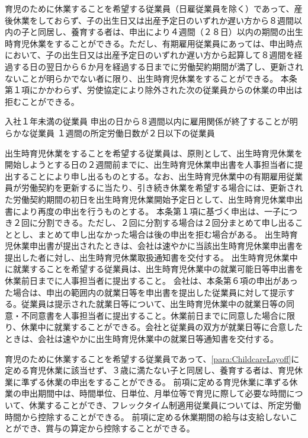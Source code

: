 \documentclass[10pt,a4paper,uplatex]{jsarticle}
\begin{document}
育児のために休業することを希望する従業員（日雇従業員を除く）であって、産後休業をしておらず、子の出生日又は出産予定日のいずれか遅い方から８週間以内の子と同居し、養育する者は、申出により４週間（２８日）以内の期間の出生時育児休業をすることができる。ただし、有期雇用従業員にあっては、申出時点において、子の出生日又は出産予定日のいずれか遅い方から起算して８週間を経過する日の翌日から６か月を経過する日までに労働契約期間が満了し、更新されないことが明らかでない者に限り、出生時育児休業をすることができる。
\label{para:ChildbirthChildcareLayoff}
\term 本条第１項にかかわらず、労使協定により除外された次の従業員からの休業の申出は拒むことができる。
\begin{enumerate}
    \itm 入社１年未満の従業員
    \itm 申出の日から８週間以内に雇用関係が終了することが明らかな従業員
    \itm １週間の所定労働日数が２日以下の従業員
\end{enumerate}
\term 出生時育児休業をすることを希望する従業員は、原則として、出生時育児休業を開始しようとする日の２週間前までに、出生時育児休業申出書を人事担当者に提出することにより申し出るものとする。なお、出生時育児休業中の有期雇用従業員が労働契約を更新するに当たり、引き続き休業を希望する場合には、更新された労働契約期間の初日を出生時育児休業開始予定日として、出生時育児休業申出書により再度の申出を行うものとする。
\term 本条第１項に基づく申出は、一子につき２回に分割できる。ただし、２回に分割する場合は２回分まとめて申し出ることとし、まとめて申し出なかった場合は後の申出を拒む場合がある。
\term 出生時育児休業申出書が提出されたときは、会社は速やかに当該出生時育児休業申出書を提出した者に対し、出生時育児休業取扱通知書を交付する。
\term 出生時育児休業中に就業することを希望する従業員は、出生時育児休業中の就業可能日等申出書を休業前日までに人事担当者に提出すること。
\term 会社は、本条第６項の申出があった場合は、申出の範囲内の就業日等を申出書を提出した従業員に対して提示する。従業員は提示された就業日等について、出生時育児休業中の就業日等の同意・不同意書を人事担当者に提出すること。休業前日までに同意した場合に限り、休業中に就業することができる。会社と従業員の双方が就業日等に合意したときは、会社は速やかに出生時育児休業中の就業日等通知書を交付する。


育児のために休業することを希望する従業員であって、\ref{para:ChildcareLayoff}に定める育児休業に該当せず、３歳に満たない子と同居し、養育する者は、育児休業に準ずる休業の申出をすることができる。
\term
前項に定める育児休業に準ずる休業の申出期間中は、時間単位、日単位、月単位等で育児に際して必要な時間について、休業することができ、フレックタイム制適用従業員については、所定労働時間から控除することができる。
\term
前項に定める休業期間の給与は支給しないことができ、賞与の算定から控除することができる。
\end{document}
